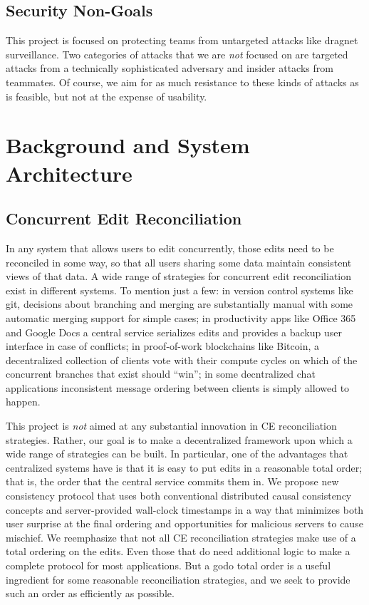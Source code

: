 \documentclass[runningheads]{llncs}
\begin{document}
\subsection{Security Non-Goals}

This project is focused on protecting teams from untargeted attacks like dragnet surveillance.
Two categories of attacks that we are \emph{not} focused on are targeted attacks from a technically sophisticated adversary and insider attacks from teammates.
Of course, we aim for as much resistance to these kinds of attacks as is feasible, but not at the expense of usability.

\section{Background and System Architecture}

\subsection{Concurrent Edit Reconciliation}

In any system that allows users to edit concurrently, those edits need to be reconciled in some way, so that all users sharing some data maintain consistent views of that data.
A wide range of strategies for concurrent edit reconciliation exist in different systems.
To mention just a few: in version control systems like git, decisions about branching and merging are substantially manual with some automatic merging support for simple cases; in productivity apps like Office 365 and Google Docs a central service serializes edits and provides a backup user interface in case of conflicts; in proof-of-work blockchains like Bitcoin, a decentralized collection of clients vote with their compute cycles on which of the concurrent branches that exist should ``win''; in some decntralized chat applications inconsistent message ordering between clients is simply allowed to happen.

This project is \emph{not} aimed at any substantial innovation in CE reconciliation strategies.
Rather, our goal is to make a decentralized framework upon which a wide range of strategies can be built.
In particular, one of the advantages that centralized systems have is that it is easy to put edits in a reasonable total order; that is, the order that the central service commits them in.
We propose new consistency protocol that uses both conventional distributed causal consistency concepts and server-provided wall-clock timestamps in a way that minimizes both user surprise at the final ordering and opportunities for malicious servers to cause mischief.
We reemphasize that not all CE reconciliation strategies make use of a total ordering on the edits.
Even those that do need additional logic to make a complete protocol for most applications.
But a godo total order is a useful ingredient for some reasonable reconciliation strategies, and we seek to provide such an order as efficiently as possible.
\end{document}
